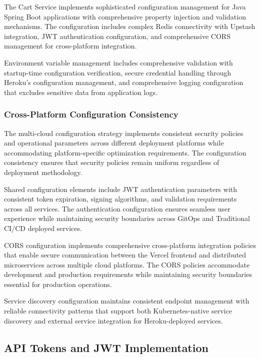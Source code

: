 The Cart Service implements sophisticated configuration management for Java Spring Boot applications with comprehensive property injection and validation mechanisms. The configuration includes complex Redis connectivity with Upstash integration, JWT authentication configuration, and comprehensive CORS management for cross-platform integration.

Environment variable management includes comprehensive validation with startup-time configuration verification, secure credential handling through Heroku's configuration management, and comprehensive logging configuration that excludes sensitive data from application logs.

\subsubsection{Cross-Platform Configuration Consistency}

The multi-cloud configuration strategy implements consistent security policies and operational parameters across different deployment platforms while accommodating platform-specific optimization requirements. The configuration consistency ensures that security policies remain uniform regardless of deployment methodology.

Shared configuration elements include JWT authentication parameters with consistent token expiration, signing algorithms, and validation requirements across all services. The authentication configuration ensures seamless user experience while maintaining security boundaries across GitOps and Traditional CI/CD deployed services.

CORS configuration implements comprehensive cross-platform integration policies that enable secure communication between the Vercel frontend and distributed microservices across multiple cloud platforms. The CORS policies accommodate development and production requirements while maintaining security boundaries essential for production operations.

Service discovery configuration maintains consistent endpoint management with reliable connectivity patterns that support both Kubernetes-native service discovery and external service integration for Heroku-deployed services.

\subsection{API Tokens and JWT Implementation}

